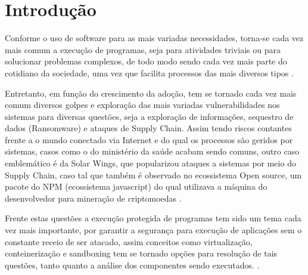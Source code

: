 \chapter{Introdução}
\label{chp:introduction}

Conforme o uso de software para as mais variadas necessidades, torna-se cada vez mais comum a execução de programas, seja para atividades triviais ou para solucionar problemas complexos, de todo modo sendo cada vez mais parte do cotidiano da sociedade, uma vez que facilita processos das mais diversos tipos \cite{bctv}.
 
Entretanto, em função do crescimento da adoção, tem se tornado cada vez mais comum diversos golpes e exploração das mais variadas vulnerabilidades nos sistemas para diversas questões, seja a exploração de informações,  sequestro de dados (Ransomware) e ataques de Supply Chain. Assim tendo riscos contantes frente a o mundo conectado via Internet e do qual os processos são geridos por sistemas, casos como o do ministério da saúde acabam sendo comuns, outro caso emblemático é da Solar Wings, que popularizou ataques a sistemas por meio do Supply Chain, caso tal que também é observado no ecossistema Open source, um pacote do NPM (ecossistema javascript) do qual utilizava a máquina do desenvolvedor para mineração de criptomoedas \cite{Magalhães_Filho_Marcheri_2022, 10.1007/978-981-13-1274-8_31, 9799263, greenberg2017supply, cpomagazine, aquasec}.

Frente estas questões a execução protegida de programas tem sido um tema cada vez mais importante, por garantir a segurança para execução de aplicações sem o constante receio de ser atacado, assim conceitos como virtualização, conteinerização e sandboxing tem se tornado opções para resolução de tais questões, tanto quanto a análise dos componentes sendo executados. \cite{10.1145/2884781.2884782, 10.1145/3344341.3368810}.
